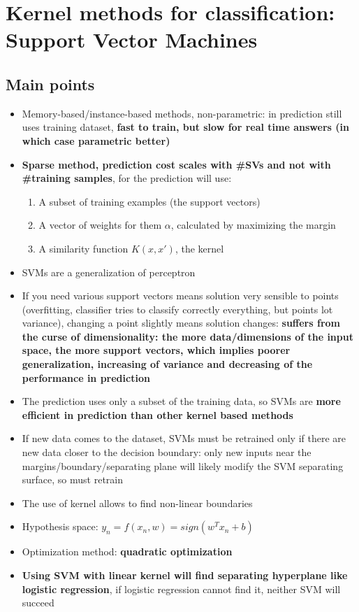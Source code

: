 
\section{Kernel methods for classification: Support Vector Machines}

\subsection{Main points}
    \begin{itemize}
        \item Memory-based/instance-based methods, non-parametric: in prediction still uses training dataset, \textbf{fast to train, but slow for real time answers (in which case parametric better)}
        \item \textbf{Sparse method, prediction cost scales with \#SVs and not with \#training samples}, for the prediction will use:
        \begin{enumerate}
            \item A subset of training examples (the support vectors)
            \item A vector of weights for them $\alpha$, calculated by maximizing the margin
            \item A similarity function $K(x,x')$, the kernel
        \end{enumerate}
        \item SVMs are a generalization of perceptron
        \item If you need various support vectors means solution very sensible to points (overfitting, classifier tries to classify correctly everything, but points lot variance), changing a point slightly means solution changes: \textbf{suffers from the curse of dimensionality: the more data/dimensions of the input space, the more support vectors, which implies poorer generalization, increasing of variance and decreasing of the performance in prediction}
        \item The prediction uses only a subset of the training data, so SVMs are \textbf{more efficient in prediction than other kernel based methods}
        \item If new data comes to the dataset, SVMs must be retrained only if there are new data closer to the decision boundary: only new inputs near the margins/boundary/separating plane will likely modify the SVM separating surface, so must retrain
        \item The use of kernel allows to find non-linear boundaries
        \item Hypothesis space: $y_n=f(x_n,w)=sign(w^Tx_n+b)$
        \item Optimization method: \textbf{quadratic optimization}
        \item \textbf{Using SVM with linear kernel will find separating hyperplane like logistic regression}, if logistic regression cannot find it, neither SVM will succeed
    \end{itemize}

